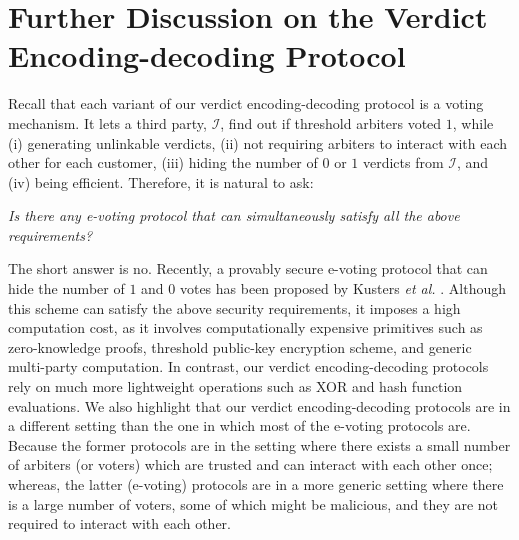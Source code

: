 
\section{Further Discussion on the Verdict Encoding-decoding Protocol}\label{sec:: Further-Discussion-on-the-Encoding-decoding-Protocol}




Recall that  each variant of our verdict encoding-decoding protocol is a voting mechanism. It  lets a third party, $\mathcal{I}$, find out if threshold arbiters voted $1$, while (i) generating unlinkable verdicts, (ii) not requiring arbiters to interact with each other for each customer, (iii) hiding the number of $0$ or $1$ verdicts from  $\mathcal{I}$, and (iv) being  efficient. Therefore, it is natural to ask: 

\begin{center}
\emph{Is there   any {e-voting} protocol that can  simultaneously satisfy all the above requirements?}
\end{center}


The short answer is no. Recently, a provably secure  e-voting protocol that can hide the number of $1$ and $0$ votes has been proposed by K{u}sters \textit{et al.} \cite{KustersL00020}. Although this scheme can satisfy the above security requirements, it imposes a high computation cost, as  it involves computationally expensive primitives such as zero-knowledge proofs, threshold public-key encryption scheme, and generic multi-party computation. In contrast, our verdict encoding-decoding protocols rely on much more lightweight operations such as XOR and hash function evaluations.  We also  highlight that our verdict encoding-decoding protocols are in a different setting than the one in which most of the e-voting protocols are. Because the former protocols are in the setting where there exists a small number of arbiters (or voters) which are trusted and can interact with each other once; whereas, the latter (e-voting) protocols are in a more   generic setting where there is a large number of  voters, some of which might be malicious, and they are not   required to interact with each other. 


